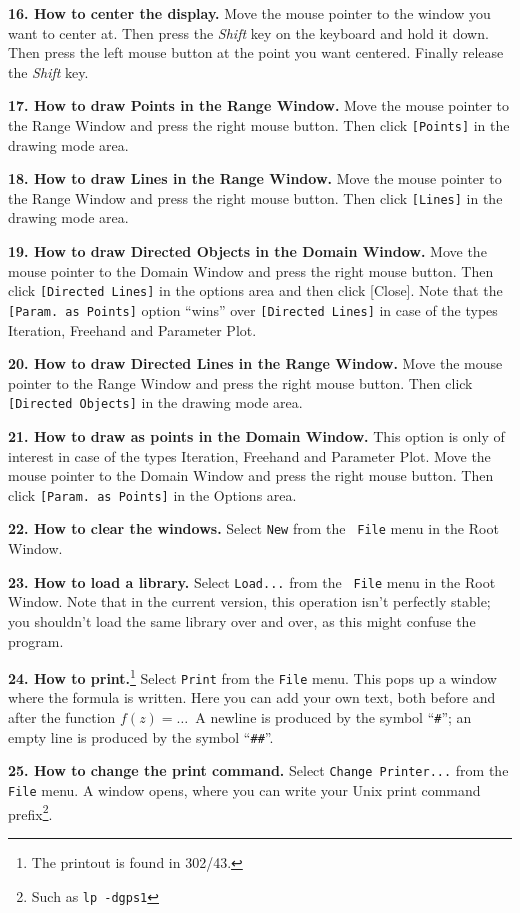 \documentclass[10pt,a4paper]{article}
\begin{document}
{\bf 16. How to center the display.} Move the mouse pointer to the
window you want to center at. Then press the {\it Shift} key on the
keyboard and hold it down. Then press the left mouse button at the
point you want centered. Finally release the {\it Shift} key.



{\bf 17. How to draw Points in the Range Window.} Move the mouse
pointer to the Range Window and press the right mouse button.  Then
click {\tt [Points]} in the drawing mode area.



{\bf 18. How to draw Lines in the Range Window.} Move the mouse
pointer to the Range Window and press the right mouse button.  Then
click {\tt [Lines]} in the drawing mode area.



{\bf 19. How to draw Directed Objects in the Domain Window.} Move the
mouse pointer to the Domain Window and press the right mouse
button. Then click {\tt [Directed Lines]} in the options area and then
click [Close]. Note that the {\tt [Param.\ as Points]} option ``wins''
over {\tt [Directed Lines]} in case of the types Iteration, Freehand
and Parameter Plot.



{\bf 20. How to draw Directed Lines in the Range Window.} Move the
mouse pointer to the Range Window and press the right mouse button.
Then click {\tt [Directed Objects]} in the drawing mode area.



{\bf 21. How to draw as points in the Domain Window.} This option is
only of interest in case of the types Iteration, Freehand and
Parameter Plot. Move the mouse pointer to the Domain Window and press
the right mouse button. Then click {\tt [Param.\ as Points]} in the
Options area.



{\bf 22. How to clear the windows.} Select {\tt New} from the {\tt
File} menu in the Root Window.



{\bf 23. How to load a library.} Select {\tt Load...} from the {\tt
File} menu in the Root Window. Note that in the current version, this
operation isn't perfectly stable; you shouldn't load the same library
over and over, as this might confuse the program.



{\bf 24. How to print.}\footnote{The printout is found in 302/43.}
Select {\tt Print} from the {\tt File} menu. This pops up a window
where the formula is written. Here you can add your own text, both
before and after the function $f(z)=\dots$\ A newline is produced by
the symbol ``{\tt \#}''; an empty line is produced by the symbol
``{\tt \#\#}''.



{\bf 25. How to change the print command.} Select {\tt Change
Printer...} from the {\tt File} menu. A window opens, where you can
write your Unix print command prefix\footnote{Such as {\tt lp
-dgps1}}.
\end{document}

